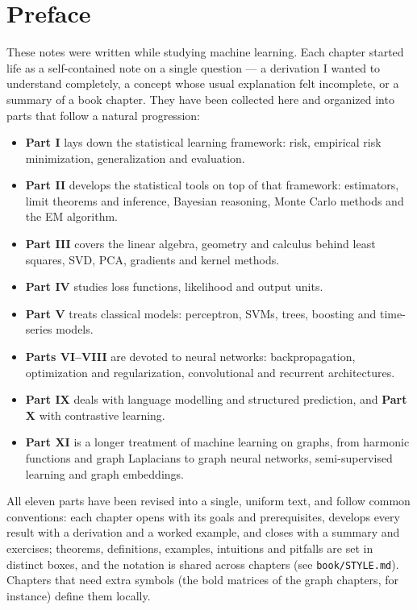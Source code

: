 \chapter*{Preface}

These notes were written while studying machine learning. Each chapter
started life as a self-contained note on a single question --- a
derivation I wanted to understand completely, a concept whose usual
explanation felt incomplete, or a summary of a book chapter. They have
been collected here and organized into parts that follow a natural
progression:

\begin{itemize}
  \item \textbf{Part I} lays down the statistical learning framework:
        risk, empirical risk minimization, generalization and evaluation.
  \item \textbf{Part II} develops the statistical tools on top of that
        framework: estimators, limit theorems and inference, Bayesian
        reasoning, Monte Carlo methods and the EM algorithm.
  \item \textbf{Part III} covers the linear algebra, geometry and calculus
        behind least squares, SVD, PCA, gradients and kernel methods.
  \item \textbf{Part IV} studies loss functions, likelihood and output units.
  \item \textbf{Part V} treats classical models: perceptron, SVMs, trees,
        boosting and time-series models.
  \item \textbf{Parts VI--VIII} are devoted to neural networks:
        backpropagation, optimization and regularization, convolutional
        and recurrent architectures.
  \item \textbf{Part IX} deals with language modelling and structured
        prediction, and \textbf{Part X} with contrastive learning.
  \item \textbf{Part XI} is a longer treatment of machine learning on
        graphs, from harmonic functions and graph Laplacians to graph
        neural networks, semi-supervised learning and graph embeddings.
\end{itemize}

All eleven parts have been revised into a single, uniform text, and
follow common conventions: each chapter
opens with its goals and prerequisites, develops every result with a
derivation and a worked example, and closes with a summary and exercises;
theorems, definitions, examples, intuitions and pitfalls are set in
distinct boxes, and the notation is shared across chapters (see
\texttt{book/STYLE.md}). Chapters that need extra symbols (the bold
matrices of the graph chapters, for instance) define them locally.
